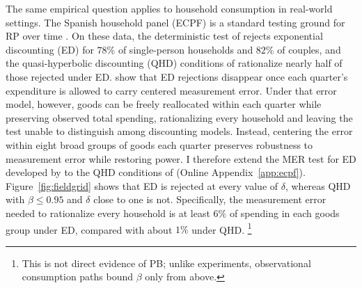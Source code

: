 \documentclass[11pt,a4paper]{article}
\theoremstyle{plain}
\theoremstyle{definition}
\begin{document}
The same empirical question applies to household consumption in real-world settings. 
The Spanish household panel (ECPF) is a standard testing ground for RP over time \citep[e.g.,][]{adams2014}. On these data, the deterministic test of \citet{browning1989} rejects exponential discounting (ED) for $78\%$ of single-person households and $82\%$ of couples, and the quasi-hyperbolic discounting (QHD) conditions of \citet{bbc2021} 
rationalize nearly half of those rejected under ED. \citet{aguiar2021} show that ED rejections disappear once each quarter's expenditure is allowed to carry centered measurement error. 
Under that error model, however, goods can be freely reallocated within each quarter while preserving observed total spending, rationalizing every household and leaving the test unable to distinguish among discounting models.
Instead, centering the error within eight broad groups of goods each quarter \citep[the aggregates of][]{adams2014} preserves robustness to measurement error while restoring power.
I therefore extend the MER test for ED developed by \citet{aguiar2021} to the QHD conditions of \citet{bbc2021} (Online Appendix~\ref{app:ecpf}).
Figure~\ref{fig:fieldgrid} shows that ED is rejected at every value of $\delta$, whereas QHD with $\beta\le0.95$ and $\delta$ close to one is not.
Specifically, the measurement error needed to rationalize every household is at least $6\%$ of spending in each goods group under ED, compared with about $1\%$ under QHD.%
\footnote{This is not direct evidence of PB; unlike experiments, observational consumption paths bound $\beta$ only from above.}
\end{document}
